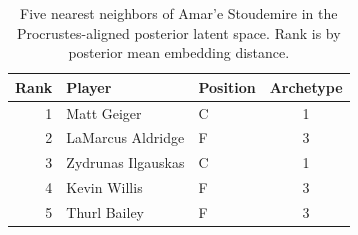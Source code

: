 \begin{table}[htbp]
  \centering\small
  \begin{tabular}{rllc}
    \toprule
    Rank & Player & Position & Archetype \\
    \midrule
    1 & Matt Geiger & C & 1 \\
    2 & LaMarcus Aldridge & F & 3 \\
    3 & Zydrunas Ilgauskas & C & 1 \\
    4 & Kevin Willis & F & 3 \\
    5 & Thurl Bailey & F & 3 \\
    \bottomrule
  \end{tabular}
  \caption{Five nearest neighbors of Amar'e Stoudemire in the Procrustes-aligned posterior latent space. Rank is by posterior mean embedding distance.}
  \label{tab:Amar_e_Stoudemire_neighbors}
\end{table}

